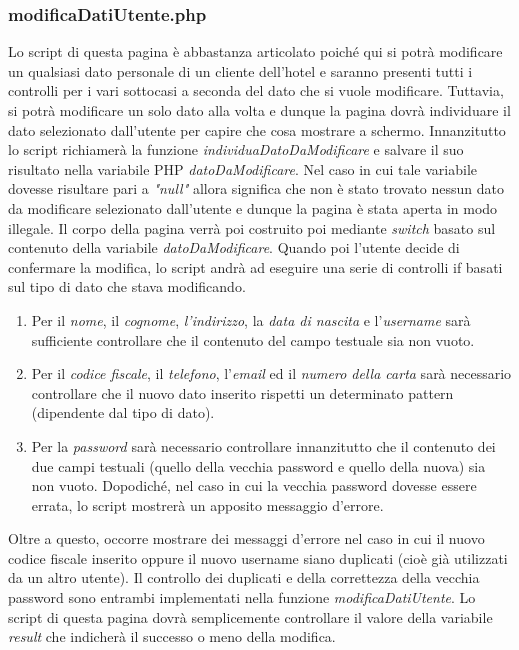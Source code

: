 \documentclass [a4paper, 12pt]{book}
\begin{document}
\subsubsection{modificaDatiUtente.php}
Lo script di questa pagina è abbastanza articolato poiché qui si potrà modificare un qualsiasi dato personale di un cliente dell'hotel e saranno presenti tutti i controlli per i vari sottocasi a seconda del dato che si vuole modificare. Tuttavia, si potrà modificare un solo dato alla volta e dunque la pagina dovrà individuare il dato selezionato dall'utente per capire che cosa mostrare a schermo. Innanzitutto lo script richiamerà la funzione \textit{individuaDatoDaModificare} e salvare il suo risultato nella variabile PHP \textit{datoDaModificare}. Nel caso in cui tale variabile dovesse risultare pari a \textit{"null"} allora significa che non è stato trovato nessun dato da modificare selezionato dall'utente e dunque la pagina è stata aperta in modo illegale. Il corpo della pagina verrà poi costruito poi mediante \textit{switch} basato sul contenuto della variabile \textit{datoDaModificare}. Quando poi l'utente decide di confermare la modifica, lo script andrà ad eseguire una serie di controlli if basati sul tipo di dato che stava modificando.
\begin{enumerate}
\item Per il \textit{nome}, il \textit{cognome}, \textit{l'indirizzo}, la \textit{data di nascita} e l'\textit{username} sarà sufficiente controllare che il contenuto del campo testuale sia non vuoto.
\item Per il \textit{codice fiscale}, il \textit{telefono}, l'\textit{email} ed il \textit{numero della carta} sarà necessario controllare che il nuovo dato inserito rispetti un determinato pattern (dipendente dal tipo di dato).
\item Per la \textit{password} sarà necessario controllare innanzitutto che il contenuto dei due campi testuali (quello della vecchia password e quello della nuova) sia non vuoto. Dopodiché, nel caso in cui la vecchia password dovesse essere errata, lo script mostrerà un apposito messaggio d'errore.
\end{enumerate}
Oltre a questo, occorre mostrare dei messaggi d'errore nel caso in cui il nuovo codice fiscale inserito oppure il nuovo username siano duplicati (cioè già utilizzati da un altro utente). Il controllo dei duplicati e della correttezza della vecchia password sono entrambi implementati nella funzione \textit{modificaDatiUtente}. Lo script di questa pagina dovrà semplicemente controllare il valore della variabile \textit{result} che indicherà il successo o meno della modifica.
\end{document}
